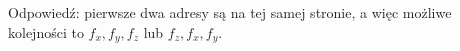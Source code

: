 Odpowiedź: pierwsze dwa adresy są na tej samej stronie, a więc możliwe kolejności to \(f_x, f_y, f_z\) lub \(f_z, f_x, f_y \).
